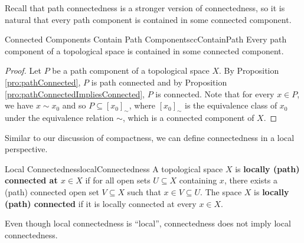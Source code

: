 \documentclass[math]{amznotes}
\theoremstyle{remark}
\begin{document}
Recall that path connectedness is a stronger version of connectedness, so it is natural that every path component is contained in some connected component.
\begin{probox}{Connected Components Contain Path Components}{ccContainPath}
    Every path component of a topological space is contained in some connected component.
    \tcblower
    \begin{proof}
        Let $P$ be a path component of a topological space $X$. By Proposition \ref{pro:pathConnected}, $P$ is path connected and by Proposition \ref{pro:pathConnectedImpliesConnected}, $P$ is connected. Note that for every $x \in P$, we have $x \sim x_0$ and so $P \subseteq \left[x_0\right]_{\sim}$, where $\left[x_0\right]_{\sim}$ is the equivalence class of $x_0$ under the equivalence relation $\sim$, which is a connected component of $X$.
    \end{proof}
\end{probox}
Similar to our discussion of compactness, we can define connectedness in a local perspective.
\begin{dfnbox}{Local Connectedness}{localConnectedness}
    A topological space $X$ is {\color{red} \textbf{locally (path) connected at $x \in X$}} if for all open sets $U \subseteq X$ containing $x$, there exists a (path) connected open set $V \subseteq X$ such that $x \in V \subseteq U$. The space $X$ is {\color{red} \textbf{locally (path) connected}} if it is locally connected at every $x \in X$.
\end{dfnbox}
Even though local connectedness is ``local'', connectedness does not imply local connectedness.
\end{document}
